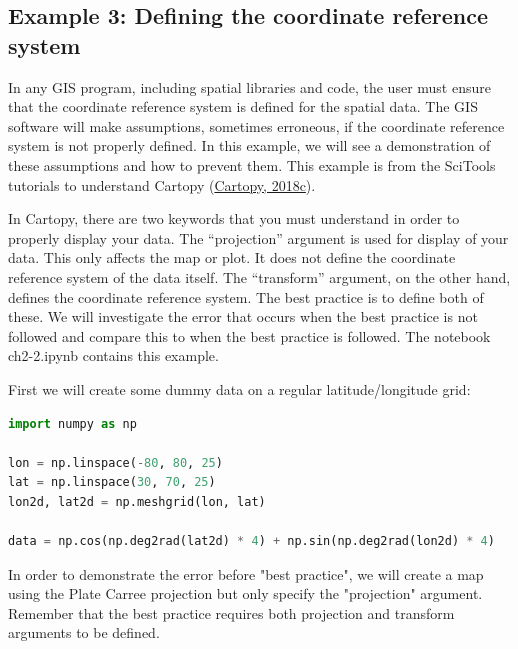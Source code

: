 \documentclass[a4paper , 12pt]{book}
\begin{document}
\subsection*{Example 3: Defining the coordinate reference system}

In any GIS program, including spatial libraries and code, the user must ensure that the coordinate reference system is defined for the spatial data. The GIS software will make assumptions, sometimes erroneous, if the coordinate reference system is not properly defined. In this example, we will see a demonstration of these assumptions and how to prevent them. This example is from the SciTools tutorials to understand Cartopy (\href{https://scitools.org.uk/cartopy/docs/latest/tutorials/understanding_transform.html}{Cartopy, 2018c}).

In Cartopy, there are two keywords that you must understand in order to properly display your data. The “projection” argument is used for display of your data. This only affects the map or plot. It does not define the coordinate reference system of the data itself. The “transform” argument, on the other hand, defines the coordinate reference system. The best practice is to define both of these. We will investigate the error that occurs when the best practice is not followed and compare this to when the best practice is followed. The notebook ch2-2.ipynb contains this example.

First we will create some dummy data on a regular latitude/longitude grid:

\begin{center}
\begin{lstlisting}[language=Python, frame=single]
import numpy as np

lon = np.linspace(-80, 80, 25)
lat = np.linspace(30, 70, 25)
lon2d, lat2d = np.meshgrid(lon, lat)

data = np.cos(np.deg2rad(lat2d) * 4) + np.sin(np.deg2rad(lon2d) * 4)
\end{lstlisting}
\end{center}

In order to demonstrate the error before "best practice", we will create a map using the Plate Carree projection but only specify the "projection" argument. Remember that the best practice requires both projection and transform arguments to be defined.
\end{document}
